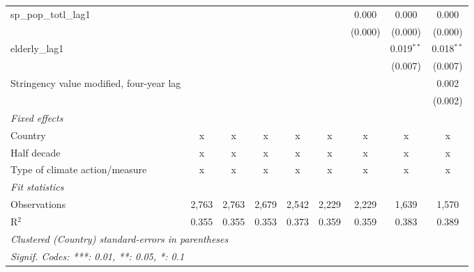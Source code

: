 \begin{tabular}{lcccccccc}
   sp\_pop\_totl\_lag1                           &               &               &              &              &             & 0.000   & 0.000        & 0.000\\   
                                                 &               &               &              &              &             & (0.000) & (0.000)      & (0.000)\\   
   elderly\_lag1                                 &               &               &              &              &             &         & 0.019$^{**}$ & 0.018$^{**}$\\   
                                                 &               &               &              &              &             &         & (0.007)      & (0.007)\\   
   Stringency value modified, four-year lag      &               &               &              &              &             &         &              & 0.002\\   
                                                 &               &               &              &              &             &         &              & (0.002)\\   
   \emph{Fixed effects}\\
   Country                                       & x             & x             & x            & x            & x           & x       & x            & x\\  
   Half decade                                   & x             & x             & x            & x            & x           & x       & x            & x\\  
   Type of climate action/measure                & x             & x             & x            & x            & x           & x       & x            & x\\  
   \midrule \emph{Fit statistics}\\
   Observations                                  & 2,763         & 2,763         & 2,679        & 2,542        & 2,229       & 2,229   & 1,639        & 1,570\\  
   R$^2$                                         & 0.355         & 0.355         & 0.353        & 0.373        & 0.359       & 0.359   & 0.383        & 0.389\\  
   \midrule
   \multicolumn{9}{l}{\emph{Clustered (Country) standard-errors in parentheses}}\\
   \multicolumn{9}{l}{\emph{Signif. Codes: ***: 0.01, **: 0.05, *: 0.1}}\\
\end{tabular}
\par\endgroup


